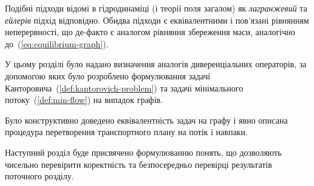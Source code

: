 Подібні підходи відомі в гідродинаміці (і теорії поля загалом) як \textit{лагранжевий} та \textit{ейлерів} підхід відповідно. 
Обидва підходи є еквівалентними і пов'язані рівнянням неперервності, що де-факто є аналогом рівняння збереження маси,
аналогічно до~(\ref{eq:equilibrium-graph}).

\chapconclude{\ref{chap:graph}}
У цьому розділі було надано визначення аналогів диверенціальних операторів, за допомогою яких
було розроблено формулювання задачі Канторовича~(\ref{def:kantorovich-problem})
та задачі мінімального потоку~(\ref{def:min-flow}) на випадок графів.

Було конструктивно доведено еквівалентність задач на графу і явно описана процедура перетворення
транспортного плану на потік і навпаки.

Наступний розділ буде присвячено формулюванню понять, що дозволяють чисельно перевірити коректність та безпосередньо
перевірці результатів поточного розділу.